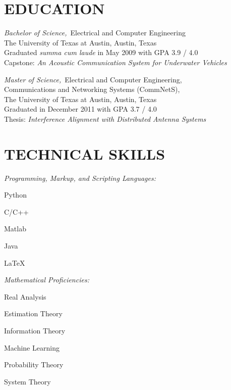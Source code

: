 \documentclass[line,margin=1in]{res}
\begin{document}
\address{1205 Larkwood Drive, Austin, Texas 78723}
\address{512-237-7562 \\ \url{jonstarr@utexas.edu}}
 
\begin{resume}

\section{EDUCATION} 
{\sl Bachelor of Science,}\ Electrical and Computer Engineering \\
  The University of Texas at Austin, Austin, Texas \\
  Graduated \textit{summa cum laude} in May 2009 with GPA 3.9 / 4.0 \\
  Capstone: \textit{An Acoustic Communication System for Underwater Vehicles}~\cite{starr2009acoustic}

{\sl Master of Science,}\ Electrical and Computer Engineering, \\
  Communications and Networking Systems (CommNetS), \\
  The University of Texas at Austin, Austin, Texas \\
  Graduated in December 2011 with GPA 3.7 / 4.0 \\
  Thesis: \textit{Interference Alignment with Distributed Antenna Systems}~\cite{starr2011thesis}

\section{TECHNICAL SKILLS} 
  {\sl Programming, Markup, and Scripting Languages:}
  \vspace*{-0.75\baselineskip}
  \begin{multicols}{6}
    \begin{compactitem}
      \item{Python}
      \item{C/C++}
      \item{Matlab}
      \item{Java}
      \item{\LaTeX}
    \end{compactitem}
  \end{multicols}

  \vspace*{-1.5\baselineskip}

  {\sl Mathematical Proficiencies:}
  \vspace*{-0.75\baselineskip}
  \begin{multicols}{3}
    \begin{compactitem}
      \item{Real Analysis}
      \item{Estimation Theory}
      \item{Information Theory}
      \item{Machine Learning}
      \item{Probability Theory}
      \item{System Theory}
    \end{compactitem}
  \end{multicols}


\end{resume}
\end{document}
